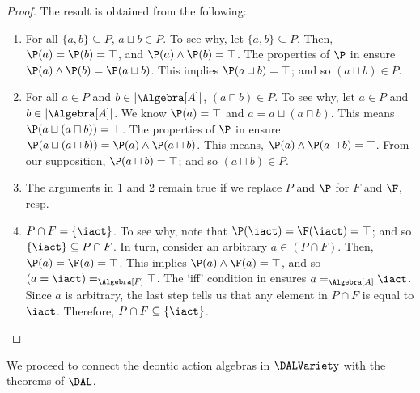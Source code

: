 \medskip
{}
\begin{proof}
	The result is obtained from the following:
		\medskip
		\begin{enumerate}%
			\setlength{\itemsep}{5pt}
			\item
			For all $\{a,b\} \subseteq P$, ${a \sqcup b} \in P$.
			To see why, let $\{a,b\} \subseteq P$.
			Then, $\P(a) = \P(b) = \top$, and $\P(a) \land \P(b) = \top$.
			The properties of $\P$ in  ensure $\P(a) \land \P(b) = \P(a \sqcup b)$.
			This implies $\P(a \sqcup b) = \top$; and so $(a \sqcup b) \in P$.

			\item
			For all $a \in P$ and $b \in |\Algebra[A]|$, ${(a \sqcap b)} \in P$.
			To see why, let $a \in P$ and $b \in |\Algebra[A]|$.
			We know $\P(a) = \top$ and $a = {a \sqcup (a \sqcap b)}$.
			This means $\P({a \sqcup (a \sqcap b)}) = \top$.
			The properties of $\P$ in  ensure $\P(a \sqcup (a \sqcap b)) = \P(a) \land \P(a \sqcap b)$.
			This means, $\P(a) \land \P(a \sqcap b) = \top$.
			From our supposition, $\P(a \sqcap b) = \top$; and so $(a \sqcap b) \in P$.

			\item
			The arguments in 1 and 2 remain true if we replace $P$ and $\P$ for $F$ and $\F$, resp.

			\item
			${P \cap F} = \{ \iact \}$.
			To see why, note that $\P(\iact) = \F(\iact) = \top$; and so $\{\iact\} \subseteq {P \cap F}$.
			In turn, consider an arbitrary $a \in (P \cap F)$.
			Then, $\P(a) = \F(a) = \top$.
			This implies $\P(a) \land \F(a) = \top$, and so $(a = \iact) =_{\Algebra[F]} \top$.
			The `iff' condition in  ensures $a =_{\Algebra[A]} \iact$.
			Since $a$ is arbitrary, the last step tells us that any element in ${P \cap F}$ is equal to $\iact$.
			Therefore, ${P \cap F} \subseteq \{ \iact \}$. \qedhere
		\end{enumerate}
\end{proof}

We proceed to connect the deontic action algebras in $\DALVariety$ with the theorems of $\DAL$.

